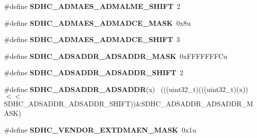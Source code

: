 \begin{DoxyCompactItemize}
\item 
\hypertarget{group___s_d_h_c___register___masks_ga75e811daac256a56735bf2a822440434}{}\#define {\bfseries S\+D\+H\+C\+\_\+\+A\+D\+M\+A\+E\+S\+\_\+\+A\+D\+M\+A\+L\+M\+E\+\_\+\+S\+H\+I\+F\+T}~2\label{group___s_d_h_c___register___masks_ga75e811daac256a56735bf2a822440434}

\item 
\hypertarget{group___s_d_h_c___register___masks_ga2c0005f89f635749f423284e92025434}{}\#define {\bfseries S\+D\+H\+C\+\_\+\+A\+D\+M\+A\+E\+S\+\_\+\+A\+D\+M\+A\+D\+C\+E\+\_\+\+M\+A\+S\+K}~0x8u\label{group___s_d_h_c___register___masks_ga2c0005f89f635749f423284e92025434}

\item 
\hypertarget{group___s_d_h_c___register___masks_gab96190a44e154d4acd156f0026d4c363}{}\#define {\bfseries S\+D\+H\+C\+\_\+\+A\+D\+M\+A\+E\+S\+\_\+\+A\+D\+M\+A\+D\+C\+E\+\_\+\+S\+H\+I\+F\+T}~3\label{group___s_d_h_c___register___masks_gab96190a44e154d4acd156f0026d4c363}

\item 
\hypertarget{group___s_d_h_c___register___masks_gaf351e8cc179a6507219df80133e901dd}{}\#define {\bfseries S\+D\+H\+C\+\_\+\+A\+D\+S\+A\+D\+D\+R\+\_\+\+A\+D\+S\+A\+D\+D\+R\+\_\+\+M\+A\+S\+K}~0x\+F\+F\+F\+F\+F\+F\+F\+Cu\label{group___s_d_h_c___register___masks_gaf351e8cc179a6507219df80133e901dd}

\item 
\hypertarget{group___s_d_h_c___register___masks_ga6bad5e40bfb6829aa79079fa8748a7d1}{}\#define {\bfseries S\+D\+H\+C\+\_\+\+A\+D\+S\+A\+D\+D\+R\+\_\+\+A\+D\+S\+A\+D\+D\+R\+\_\+\+S\+H\+I\+F\+T}~2\label{group___s_d_h_c___register___masks_ga6bad5e40bfb6829aa79079fa8748a7d1}

\item 
\hypertarget{group___s_d_h_c___register___masks_gac4f7eac0fa74378127b9d352f0806f43}{}\#define {\bfseries S\+D\+H\+C\+\_\+\+A\+D\+S\+A\+D\+D\+R\+\_\+\+A\+D\+S\+A\+D\+D\+R}(x)                                ~(((uint32\+\_\+t)(((uint32\+\_\+t)(x))$<$$<$S\+D\+H\+C\+\_\+\+A\+D\+S\+A\+D\+D\+R\+\_\+\+A\+D\+S\+A\+D\+D\+R\+\_\+\+S\+H\+I\+F\+T))\&S\+D\+H\+C\+\_\+\+A\+D\+S\+A\+D\+D\+R\+\_\+\+A\+D\+S\+A\+D\+D\+R\+\_\+\+M\+A\+S\+K)\label{group___s_d_h_c___register___masks_gac4f7eac0fa74378127b9d352f0806f43}

\item 
\hypertarget{group___s_d_h_c___register___masks_ga83921c53d734582d4faefacf105dab13}{}\#define {\bfseries S\+D\+H\+C\+\_\+\+V\+E\+N\+D\+O\+R\+\_\+\+E\+X\+T\+D\+M\+A\+E\+N\+\_\+\+M\+A\+S\+K}~0x1u\label{group___s_d_h_c___register___masks_ga83921c53d734582d4faefacf105dab13}


\end{DoxyCompactItemize}
